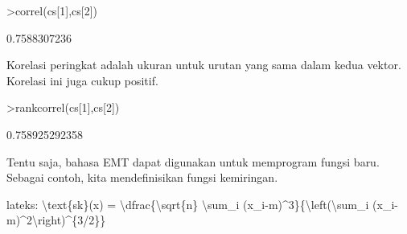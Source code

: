 \documentclass[12pt,arial,letterpaper]{book}
\begin{document}
\begin{eulernootebook}
\begin{eulercomment}
\begin{eulercomment}
\begin{eulernootebook}
\begin{eulercomment}
\begin{eulercomment}
\begin{eulercomment}
\begin{eulercomment}
\begin{eulercomment}
\begin{eulercomment}
\begin{eulercomment}
\begin{eulerprompt}
>correl(cs[1],cs[2])
\end{eulerprompt}
\begin{euleroutput}
  0.7588307236
\end{euleroutput}
\begin{eulercomment}
Korelasi peringkat adalah ukuran untuk urutan yang sama dalam kedua
vektor. Korelasi ini juga cukup positif.
\end{eulercomment}
\begin{eulerprompt}
>rankcorrel(cs[1],cs[2])
\end{eulerprompt}
\begin{euleroutput}
  0.758925292358
\end{euleroutput}
\begin{eulercomment}
Tentu saja, bahasa EMT dapat digunakan untuk memprogram fungsi baru.
Sebagai contoh, kita mendefinisikan fungsi kemiringan.

lateks: \textbackslash{}text\{sk\}(x) = \textbackslash{}dfrac\{\textbackslash{}sqrt\{n\} \textbackslash{}sum\_i (x\_i-m)\textasciicircum{}3\}\{\textbackslash{}left(\textbackslash{}sum\_i
(x\_i-m)\textasciicircum{}2\textbackslash{}right)\textasciicircum{}\{3/2\}\}


\end{eulercomment}
\end{eulercomment}
\end{eulercomment}
\end{eulercomment}
\end{eulercomment}
\end{eulercomment}
\end{eulercomment}
\end{eulercomment}
\end{eulernootebook}
\end{eulercomment}
\end{eulercomment}
\end{eulernootebook}
\end{document}
